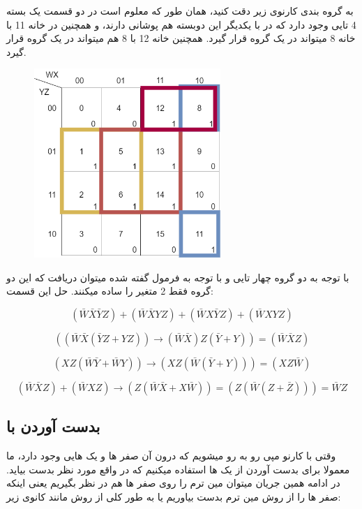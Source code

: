 \documentclass[20pt, a4paper]{article}
\begin{document}
\newpage



به گروه بندی کارنوی زیر دقت کنید، 
همان طور که معلوم است در دو قسمت یک بسته 4 تایی وجود دارد که در با یکدیگر این دوبسته
هم پوشانی دارند، و همچنین در خانه 11 با خانه 8 میتواند در یک گروه قرار گیرد.
همچنین خانه 12 با 8 هم میتواند در یک گروه قرار گیرد.

\begin{figure}[htbp]\centering
	\centerline{\includegraphics[width=200pt]{img/karnoughMap/k5.png}}
\end{figure}

با توجه به دو گروه چهار تایی و با توجه به فرمول گفته شده میتوان دریافت که این 
دو گروه فقط 2 متغیر را ساده میکنند.
حل این قسمت:

\begin{equation}
	(\bar{W}\bar{X}\bar{Y}Z)+
	(\bar{W}\bar{X}YZ) + 
	(\bar{W}X\bar{Y}Z) + 
	(\bar{W}XYZ)
\end{equation}

\begin{equation}
	((\bar{W}\bar{X}(\bar{Y}Z+YZ)) \rightarrow (\bar{W}\bar{X})Z(\bar{Y}+Y))=(\bar{W}\bar{X}Z)
\end{equation}

\begin{equation}
	(XZ(\bar{W}\bar{Y}+\bar{W}Y)) \rightarrow (XZ(\bar{W}(\bar{Y}+Y)))=(XZ\bar{W})
\end{equation}


\begin{equation}
	(\bar{W}\bar{X}Z) + (\bar{W}XZ) \rightarrow (Z(\bar{W}\bar{X}+X\bar{W})) =(Z(\bar{W}(Z+\bar{Z})))= \bar{W}Z
\end{equation}

\newpage

\subsection{بدست آوردن  با }
وقتی با کارنو مپی رو به رو میشویم که 
درون آن صفر ها و یک هایی وجود دارد، 
ما معمولا برای بدست آوردن 
از یک ها استفاده میکنیم که در واقع 
مورد نظر بدست بیاید. در ادامه همین جریان میتوان مین ترم را روی صفر ها هم در نظر بگیریم
یعنی اینکه صفر ها را از روش مین ترم بدست بیاوریم یا به طور کلی از روش 
مانند کانوی زیر:
\end{document}
